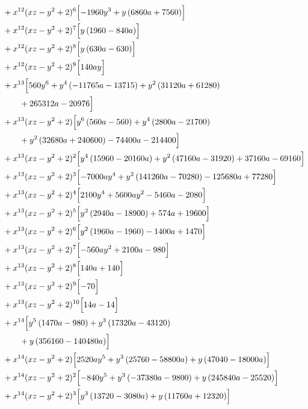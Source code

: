 \begin{align*}
&{}+x^{12}(xz-y^2+2)^{6}\Bigl[- 1960 y^{3} + y \left(6860 a + 7560\right)\Bigr]\\
&{}+x^{12}(xz-y^2+2)^{7}\Bigl[y \left(1960 - 840 a\right)\Bigr]\\
&{}+x^{12}(xz-y^2+2)^{8}\Bigl[y \left(630 a - 630\right)\Bigr]\\
&{}+x^{12}(xz-y^2+2)^{9}\Bigl[140 a y\Bigr]\\
&{}+x^{13}\Bigl[560 y^{6} + y^{4} \left(- 11765 a - 13715\right) + y^{2} \left(31120 a + 61280\right)\\
&\qquad + 265312 a - 20976\Bigr]\\
&{}+x^{13}(xz-y^2+2)\Bigl[y^{6} \left(560 a - 560\right) + y^{4} \left(2800 a - 21700\right)\\
&\qquad + y^{2} \left(32680 a + 240600\right) - 74400 a - 214400\Bigr]\\
&{}+x^{13}(xz-y^2+2)^{2}\Bigl[y^{4} \left(15960 - 20160 a\right) + y^{2} \left(47160 a - 31920\right) + 37160 a - 69160\Bigr]\\
&{}+x^{13}(xz-y^2+2)^{3}\Bigl[- 7000 a y^{4} + y^{2} \left(141260 a - 70280\right) - 125680 a + 77280\Bigr]\\
&{}+x^{13}(xz-y^2+2)^{4}\Bigl[2100 y^{4} + 5600 a y^{2} - 5460 a - 2080\Bigr]\\
&{}+x^{13}(xz-y^2+2)^{5}\Bigl[y^{2} \left(2940 a - 18900\right) + 574 a + 19600\Bigr]\\
&{}+x^{13}(xz-y^2+2)^{6}\Bigl[y^{2} \left(1960 a - 1960\right) - 1400 a + 1470\Bigr]\\
&{}+x^{13}(xz-y^2+2)^{7}\Bigl[- 560 a y^{2} + 2100 a - 980\Bigr]\\
&{}+x^{13}(xz-y^2+2)^{8}\Bigl[140 a + 140\Bigr]\\
&{}+x^{13}(xz-y^2+2)^{9}\Bigl[- 70\Bigr]\\
&{}+x^{13}(xz-y^2+2)^{10}\Bigl[14 a - 14\Bigr]\\
&{}+x^{14}\Bigl[y^{5} \left(1470 a - 980\right) + y^{3} \left(17320 a - 43120\right)\\
&\qquad + y \left(356160 - 140480 a\right)\Bigr]\\
&{}+x^{14}(xz-y^2+2)\Bigl[2520 a y^{5} + y^{3} \left(25760 - 58800 a\right) + y \left(47040 - 18000 a\right)\Bigr]\\
&{}+x^{14}(xz-y^2+2)^{2}\Bigl[- 840 y^{5} + y^{3} \left(- 37380 a - 9800\right) + y \left(245840 a - 25520\right)\Bigr]\\
&{}+x^{14}(xz-y^2+2)^{3}\Bigl[y^{3} \left(13720 - 3080 a\right) + y \left(11760 a + 12320\right)\Bigr]\\

\end{align*}
